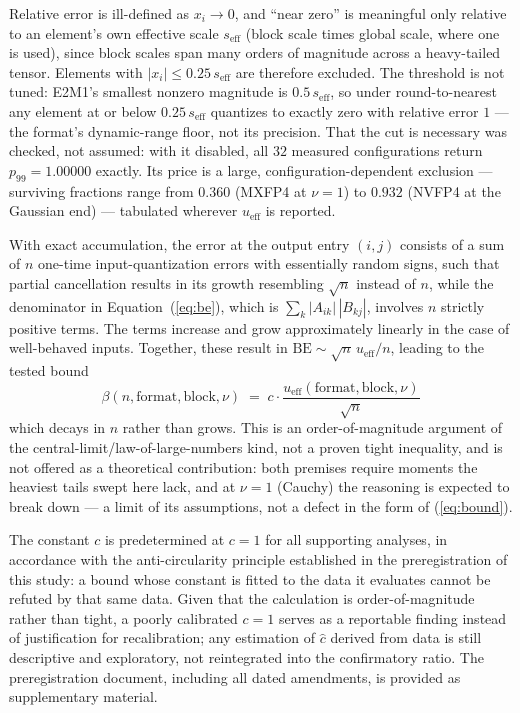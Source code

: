 Relative error is ill-defined as $x_i \to 0$, and ``near zero'' is meaningful only
relative to an element's own effective scale $s_{\mathrm{eff}}$ (block scale times
global scale, where one is used), since block scales span many orders of magnitude
across a heavy-tailed tensor. Elements with $|x_i| \le 0.25\,s_{\mathrm{eff}}$ are
therefore excluded. The threshold is not tuned: E2M1's smallest nonzero magnitude
is $0.5\,s_{\mathrm{eff}}$, so under round-to-nearest any element at or below
$0.25\,s_{\mathrm{eff}}$ quantizes to exactly zero with relative error $1$ --- the
format's dynamic-range floor, not its precision. That the cut is necessary was
checked, not assumed: with it disabled, all $32$ measured configurations return
$p_{99} = 1.00000$ exactly. Its price is a large, configuration-dependent
exclusion --- surviving fractions range from $0.360$ (MXFP4 at $\nu = 1$) to
$0.932$ (NVFP4 at the Gaussian end) --- tabulated wherever $u_{\mathrm{eff}}$ is
reported.

With exact accumulation, the error at the output entry $(i,j)$ consists of a sum
of $n$ one-time input-quantization errors with essentially random signs, such
that partial cancellation results in its growth resembling $\sqrt{n}$ instead of
$n$, while the denominator in Equation~(\ref{eq:be}), which is
$\sum_k |A_{ik}|\,|B_{kj}|$, involves $n$ strictly positive terms. The terms
increase and grow approximately linearly in the case of well-behaved inputs.
Together, these result in $\mathrm{BE} \sim \sqrt{n}\,u_{\mathrm{eff}}/n$, leading
to the tested bound
\begin{equation}
  \beta(n, \mathrm{format}, \mathrm{block}, \nu)
  \;=\; c \cdot
  \frac{u_{\mathrm{eff}}(\mathrm{format}, \mathrm{block}, \nu)}{\sqrt{n}}
  \label{eq:bound}
\end{equation}
which decays in $n$ rather than grows. This is an order-of-magnitude argument of
the central-limit/law-of-large-numbers kind, not a proven tight inequality, and
is not offered as a theoretical contribution: both premises require moments the
heaviest tails swept here lack, and at $\nu = 1$ (Cauchy) the reasoning is
expected to break down --- a limit of its assumptions, not a defect in the form
of (\ref{eq:bound}).

The constant $c$ is predetermined at $c = 1$ for all supporting analyses, in
accordance with the anti-circularity principle established in the preregistration
of this study: a bound whose constant is fitted to the data it evaluates cannot
be refuted by that same data. Given that the calculation is order-of-magnitude
rather than tight, a poorly calibrated $c = 1$ serves as a reportable finding
instead of justification for recalibration; any estimation of $\hat{c}$ derived
from data is still descriptive and exploratory, not reintegrated into the
confirmatory ratio. The preregistration document, including all dated amendments,
is provided as supplementary material.

